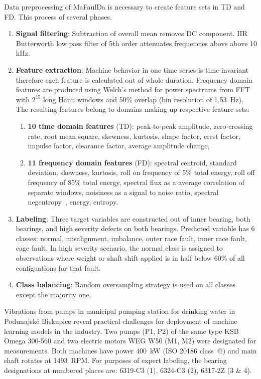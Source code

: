 \documentclass{llncs}
\makeatletter
\newcommand*{\rom}[1]{\expandafter\@slowromancap\romannumeral #1@}
\makeatother
\begin{document}
Data preprocessing of MaFaulDa is necessary to create feature sets in TD and FD. This process of several phases.
\begin{enumerate}
\item \textbf{Signal filtering}: Subtraction of overall mean removes DC component. IIR Butterworth low pass filter of 5th order attenuates frequencies above above 10 kHz.
\item \textbf{Feature extraction}: Machine behavior in one time series is time-invariant therefore each feature is calculated out of whole duration. Frequency domain features are produced using Welch's method for power spectrums from FFT with $2^{15}$ long Hann windows and 50\% overlap  (bin resolution of 1.53~Hz). The resulting features belong to domains making up respective feature sets:
\begin{enumerate}
\item \textbf{10 time domain features} (TD): peak-to-peak amplitude, zero-crossing rate, root mean square, skewness, kurtosis, shape factor, crest factor, impulse factor, clearance factor, average amplitude change,
\item \textbf{11 frequency domain features} (FD): spectral centroid, standard deviation, skewness, kurtosis, roll on frequency of 5\% total energy, roll off frequency of 85\% total energy, spectral flux as a average correlation of separate windows, noisiness as a signal to noise ratio, spectral negentropy~\cite{avoci_spectral_2020}, energy, entropy.
\end{enumerate}
\item \textbf{Labeling}: Three target variables are constructed out of inner bearing, both bearings, and high severity defects on both bearings. Predicted variable has 6 classes: normal, misalignment, imbalance, outer race fault, inner race fault, cage fault.   In high severity scenario, the normal class is assigned to observations where weight or shaft shift applied is in half below 60\% of all configuations for that fault.
\item \textbf{Class balancing}: Random oversampling strategy is used on all classes except the majority one.
\end{enumerate}

Vibrations from pumps in municipal pumping station for drinking water in Podunajské Biskupice reveal practical challenges for deployment of machine learning models in the industry. Two pumps (P1, P2) of the same type KSB Omega 300-560 and two electric motors WEG W50 (M1, M2) were designated for measurements. Both machines have power 400~kW (ISO 20186 class~\rom{3}) and main shaft rotates at 1493~RPM. For purposes of expert labeling, the bearing designations at numbered places are: 6319-C3 (1), 6324-C3 (2), 6317-2Z (3 \& 4). 
\end{document}
